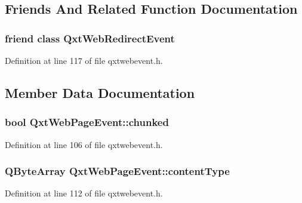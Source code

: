 \subsection{Friends And Related Function Documentation}
\hypertarget{class_qxt_web_page_event_a9f8bd36ab390863d9f86621b1b98ac60}{
\subsubsection[{Qxt\-Web\-Redirect\-Event}]{\setlength{\rightskip}{0pt plus 5cm}friend class {\bf Qxt\-Web\-Redirect\-Event}\hspace{0.3cm}{\ttfamily [friend]}}}\label{class_qxt_web_page_event_a9f8bd36ab390863d9f86621b1b98ac60}


Definition at line 117 of file qxtwebevent.\-h.



\subsection{Member Data Documentation}
\hypertarget{class_qxt_web_page_event_a06310e86eecb41b64ea256acd0e0ff3b}{
\subsubsection[{chunked}]{\setlength{\rightskip}{0pt plus 5cm}bool Qxt\-Web\-Page\-Event\-::chunked}}\label{class_qxt_web_page_event_a06310e86eecb41b64ea256acd0e0ff3b}


Definition at line 106 of file qxtwebevent.\-h.

\hypertarget{class_qxt_web_page_event_a10814905111a438f0a568e873b4aa6f1}{
\subsubsection[{content\-Type}]{\setlength{\rightskip}{0pt plus 5cm}Q\-Byte\-Array Qxt\-Web\-Page\-Event\-::content\-Type}}\label{class_qxt_web_page_event_a10814905111a438f0a568e873b4aa6f1}


Definition at line 112 of file qxtwebevent.\-h.

